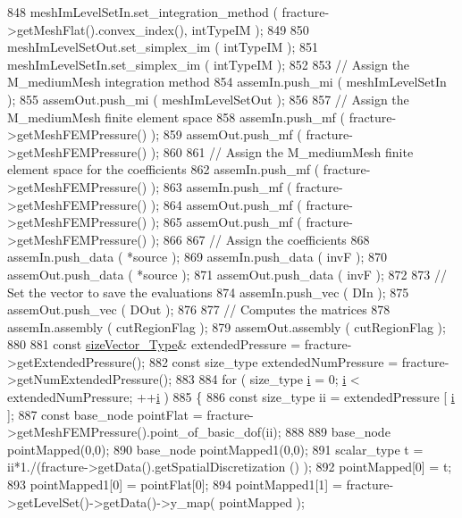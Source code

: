 \begin{DoxyCode}
848     meshImLevelSetIn.set\_integration\_method ( fracture->getMeshFlat().convex\_index(), intTypeIM );
849 
850     meshImLevelSetOut.set\_simplex\_im ( intTypeIM );
851     meshImLevelSetIn.set\_simplex\_im ( intTypeIM );
852 
853     \textcolor{comment}{// Assign the M\_mediumMesh integration method}
854     assemIn.push\_mi ( meshImLevelSetIn );
855     assemOut.push\_mi ( meshImLevelSetOut );
856 
857     \textcolor{comment}{// Assign the M\_mediumMesh finite element space}
858     assemIn.push\_mf ( fracture->getMeshFEMPressure() );
859     assemOut.push\_mf ( fracture->getMeshFEMPressure() );
860 
861     \textcolor{comment}{// Assign the M\_mediumMesh finite element space for the coefficients}
862     assemIn.push\_mf ( fracture->getMeshFEMPressure() );
863     assemIn.push\_mf ( fracture->getMeshFEMPressure() );
864     assemOut.push\_mf ( fracture->getMeshFEMPressure() );
865     assemOut.push\_mf ( fracture->getMeshFEMPressure() );
866 
867     \textcolor{comment}{// Assign the coefficients}
868     assemIn.push\_data ( *source );
869     assemIn.push\_data ( invF );
870     assemOut.push\_data ( *source );
871     assemOut.push\_data ( invF );
872 
873     \textcolor{comment}{// Set the vector to save the evaluations}
874     assemIn.push\_vec ( DIn );
875     assemOut.push\_vec ( DOut );
876 
877     \textcolor{comment}{// Computes the matrices}
878     assemIn.assembly ( cutRegionFlag );
879     assemOut.assembly ( cutRegionFlag );
880 
881     \textcolor{keyword}{const} \hyperlink{Core_8h_a83c51913d041a5001e8683434c09857f}{sizeVector\_Type}& extendedPressure = fracture->getExtendedPressure();
882     \textcolor{keyword}{const} size\_type extendedNumPressure = fracture->getNumExtendedPressure();
883 
884     \textcolor{keywordflow}{for} ( size\_type \hyperlink{matrici_8m_a6f6ccfcf58b31cb6412107d9d5281426}{i} = 0; \hyperlink{matrici_8m_a6f6ccfcf58b31cb6412107d9d5281426}{i} < extendedNumPressure; ++\hyperlink{matrici_8m_a6f6ccfcf58b31cb6412107d9d5281426}{i} )
885     \{
886         \textcolor{keyword}{const} size\_type ii = extendedPressure [ \hyperlink{matrici_8m_a6f6ccfcf58b31cb6412107d9d5281426}{i} ];
887         \textcolor{keyword}{const} base\_node pointFlat = fracture->getMeshFEMPressure().point\_of\_basic\_dof(ii);
888         
889         base\_node pointMapped(0,0);
890         base\_node pointMapped1(0,0);
891         scalar\_type t = ii*1./(fracture->getData().getSpatialDiscretization () );
892         pointMapped[0] = t;
893         pointMapped1[0] = pointFlat[0];
894         pointMapped1[1] = fracture->getLevelSet()->getData()->y\_map( pointMapped );

\end{DoxyCode}

